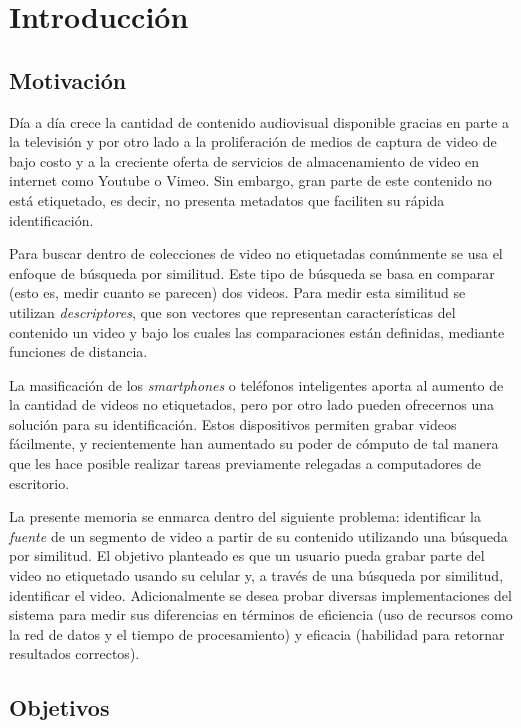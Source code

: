 \chapter{Introducción} \label{intro}

\section{Motivación} \label{motivacion}

Día a día crece la cantidad de contenido audiovisual disponible gracias en parte a la televisión y por otro lado a la proliferación de medios de captura de video de bajo costo y a la creciente oferta de servicios de almacenamiento de video en internet como Youtube o Vimeo.
Sin embargo, gran parte de este contenido no está etiquetado, es decir, no presenta metadatos que faciliten su rápida identificación. 

Para buscar dentro de colecciones de video no etiquetadas comúnmente se usa el enfoque de búsqueda por similitud. Este tipo de búsqueda se basa en comparar (esto es, medir cuanto se parecen) dos videos. Para medir esta similitud se utilizan \emph{descriptores}, que son vectores que representan características del contenido un video y bajo los cuales las comparaciones están definidas, mediante funciones de distancia.

La masificación de los \emph{smartphones} o teléfonos inteligentes aporta al aumento de la cantidad de videos no etiquetados, pero por otro lado pueden ofrecernos una solución para su identificación. Estos dispositivos permiten grabar videos fácilmente, y recientemente han aumentado su poder de cómputo de tal manera que les hace posible realizar tareas previamente relegadas a computadores de escritorio.

La presente memoria se enmarca dentro del siguiente problema: identificar la \emph{fuente} de un segmento de video a partir de su contenido utilizando una búsqueda por similitud. El objetivo planteado es que un usuario pueda grabar parte del video no etiquetado usando su celular y, a través de una búsqueda por similitud, identificar el video. 
Adicionalmente se desea probar diversas implementaciones del sistema para medir sus diferencias en términos de eficiencia (uso de recursos como la red de datos y el tiempo de procesamiento) y eficacia (habilidad para retornar resultados correctos).

\section{Objetivos} \label{objetivos}

